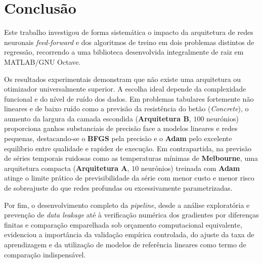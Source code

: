 \documentclass[conference]{IEEEtran}
\begin{document}
\section{Conclusão}

Este trabalho investigou de forma sistemática o impacto da arquitetura de redes neuronais \textit{feed-forward} e dos algoritmos de treino em dois problemas distintos de regressão, recorrendo a uma biblioteca desenvolvida integralmente de raiz em MATLAB/GNU Octave.

Os resultados experimentais demonstram que não existe uma arquitetura ou otimizador universalmente superior. A escolha ideal depende da complexidade funcional e do nível de ruído dos dados. Em problemas tabulares fortemente não lineares e de baixo ruído como a previsão da resistência do betão (\textit{Concrete}), o aumento da largura da camada escondida (\textbf{Arquitetura B}, $100$ neurónios) proporciona ganhos substanciais de precisão face a modelos lineares e redes pequenas, destacando-se o \textbf{BFGS} pela precisão e o \textbf{Adam} pelo excelente equilíbrio entre qualidade e rapidez de execução. Em contrapartida, na previsão de séries temporais ruidosas como as temperaturas mínimas de \textbf{Melbourne}, uma arquitetura compacta (\textbf{Arquitetura A}, $10$ neurónios) treinada com \textbf{Adam} atinge o limite prático de previsibilidade da série com menor custo e menor risco de sobreajuste do que redes profundas ou excessivamente parametrizadas.

Por fim, o desenvolvimento completo da \textit{pipeline}, desde a análise exploratória e prevenção de \textit{data leakage} até à verificação numérica dos gradientes por diferenças finitas e comparação emparelhada sob orçamento computacional equivalente, evidenciou a importância da validação empírica controlada, do ajuste da taxa de aprendizagem e da utilização de modelos de referência lineares como termo de comparação indispensável.
\end{document}
